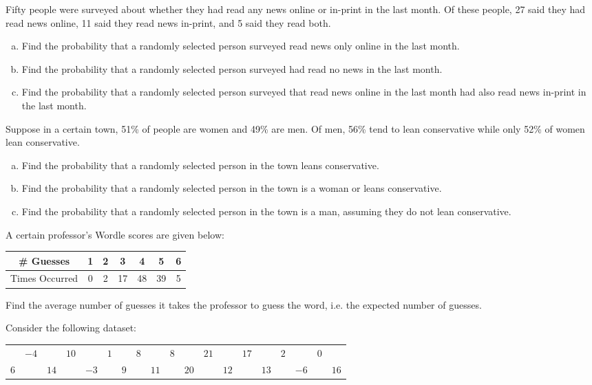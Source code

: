 \documentclass[12pt,letterpaper]{exam}
\begin{document}
\begin{questions}
\newpage
\question[10] Fifty people were surveyed about whether they had read any news online or in-print in the last month. Of these people, 27 said they had read news online, 11 said they read news in-print, and 5 said they read both. 
	\begin{enumerate}[(a)]
	\item Find the probability that a randomly selected person surveyed read news only online in the last month. 
	\item Find the probability that a randomly selected person surveyed had read no news in the last month. 
	\item Find the probability that a randomly selected person surveyed that read news online in the last month had also read news in-print in the last month. 
	\end{enumerate}



\newpage
\question[10] Suppose in a certain town, 51\% of people are women and 49\% are men. Of men, 56\% tend to lean conservative while only 52\% of women lean conservative. 
	\begin{enumerate}[(a)]
	\item Find the probability that a randomly selected person in the town leans conservative. 
	\item Find the probability that a randomly selected person in the town is a woman or leans conservative. 
	\item Find the probability that a randomly selected person in the town is a man, assuming they do not lean conservative. 
	\end{enumerate}



\newpage
\question[10] A certain professor's Wordle scores are given below: \par
	\begin{table}[h]
	\centering
	\begin{tabular}{c||cccccc}
	\# Guesses & 1 & 2 & 3 & 4 & 5 & 6 \\ \hline
	Times Occurred & 0 & 2 & 17 & 48 & 39 & 5 
	\end{tabular}
	\end{table} \par
Find the average number of guesses it takes the professor to guess the word, i.e. the expected number of guesses. 



\newpage
\question[10] Consider the following dataset: \par
	\begin{table}[h]
	\centering
	\begin{tabular}{rrrrrrrrrrrrrrrrrrr}
	& $-4$ && $10$ && $1$ && $8$ && $8$ && $21$ && $17$ && $2$ && $0$ \\ 
	$6$ && $14$ && $-3$ && $9$ && $11$ && $20$ && $12$ && $13$ && $-6$ && $16$
	\end{tabular}
	\end{table} \par


\end{questions}
\end{document}
